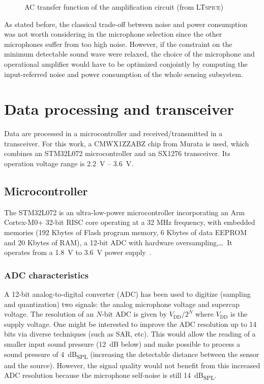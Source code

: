 \documentclass{EPL-master-thesis-covers-EN}
\newcommand{\te}[1]{\textrm{#1}}
\begin{document}
\begin{figure}[H]
    \centering
    
    \caption{AC transfer function of the amplification circuit (from \textsc{LTspice})}
    \label{fig:microphone_AC}
\end{figure}

As stated before, the classical trade-off between noise and power consumption was not worth considering in the microphone selection since the other microphones suffer from too high noise. However, if the constraint on the minimum detectable sound wave were relaxed, the choice of the microphone and operational amplifier would have to be optimized conjointly by computing the input-referred noise and power consumption of the whole sensing subsystem.


\chapter{Data processing and transceiver}

Data are processed in a microcontroller and received/transmitted in a transceiver. For this work, a CMWX1ZZABZ chip from Murata is used, which combines an STM32L072 microcontroller and an SX1276 transceiver. Its operation voltage range is \SI{2.2}{V} -- \SI{3.6}{V}.

\section{Microcontroller}

The STM32L072 is an ultra-low-power microcontroller incorporating an Arm Cortex-M0+ 32-bit RISC core operating at a 32 MHz frequency, with embedded memories (192 Kbytes of Flash program memory, 6 Kbytes of data EEPROM and 20 Kbytes of RAM), a 12-bit ADC with hardware oversampling,\dots ~It operates from a \SI{1.8}{V} to \SI{3.6}{V} power supply~\cite{STM32L072xx}.

\subsection*{ADC characteristics}

A 12-bit analog-to-digital converter (ADC) has been used to digitize (sampling and quantization) two signals: the analog microphone voltage and supercap voltage. The resolution of an $N$-bit ADC is given by $V_\te{DD}/2^N$ where $V_\te{DD}$ is the supply voltage. One might be interested to improve the ADC resolution up to 14 bits via diverse techniques (such as SAR, etc). This would allow the reading of a smaller input sound pressure (\SI{12}{dB} below) and make possible to process a sound pressure of \SI{4}{dB_{SPL}} (increasing the detectable distance between the sensor and the source). However, the signal quality would not benefit from this increased ADC resolution because the microphone self-noise is still \SI{14}{dB_{SPL}}.
\end{document}
